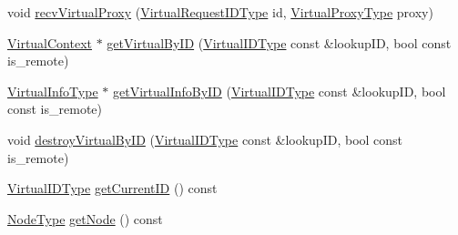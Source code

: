 \begin{DoxyCompactItemize}
\item 
void \hyperlink{structvt_1_1vrt_1_1_virtual_context_manager_ab79342508fe36427b54e3d94297e223a}{recv\+Virtual\+Proxy} (\hyperlink{namespacevt_1_1vrt_ac7ef8820ebfc383fa16f09bf46eaa2b8}{Virtual\+Request\+I\+D\+Type} id, \hyperlink{namespacevt_a1b417dd5d684f045bb58a0ede70045ac}{Virtual\+Proxy\+Type} proxy)
\item 
\hyperlink{structvt_1_1vrt_1_1_virtual_context}{Virtual\+Context} $\ast$ \hyperlink{structvt_1_1vrt_1_1_virtual_context_manager_a7e586415b9dd42012cc71134d2b5fd30}{get\+Virtual\+By\+ID} (\hyperlink{namespacevt_1_1vrt_a84d0891f52f70728c3fc2172cffb464b}{Virtual\+I\+D\+Type} const \&lookup\+ID, bool const is\+\_\+remote)
\item 
\hyperlink{structvt_1_1vrt_1_1_virtual_context_manager_ad2cd828dbd8886166b4ceb3776c49239}{Virtual\+Info\+Type} $\ast$ \hyperlink{structvt_1_1vrt_1_1_virtual_context_manager_aa05f4cec5679a32e0af06fc8283996e1}{get\+Virtual\+Info\+By\+ID} (\hyperlink{namespacevt_1_1vrt_a84d0891f52f70728c3fc2172cffb464b}{Virtual\+I\+D\+Type} const \&lookup\+ID, bool const is\+\_\+remote)
\item 
void \hyperlink{structvt_1_1vrt_1_1_virtual_context_manager_a00ec944a1360a3f4a13ecfe965c22b36}{destroy\+Virtual\+By\+ID} (\hyperlink{namespacevt_1_1vrt_a84d0891f52f70728c3fc2172cffb464b}{Virtual\+I\+D\+Type} const \&lookup\+ID, bool const is\+\_\+remote)
\item 
\hyperlink{namespacevt_1_1vrt_a84d0891f52f70728c3fc2172cffb464b}{Virtual\+I\+D\+Type} \hyperlink{structvt_1_1vrt_1_1_virtual_context_manager_ad5d3f15d0882e273bf55a48610667881}{get\+Current\+ID} () const
\item 
\hyperlink{namespacevt_a866da9d0efc19c0a1ce79e9e492f47e2}{Node\+Type} \hyperlink{structvt_1_1vrt_1_1_virtual_context_manager_ac51ab2c1e35782eeace3c1aaf297214e}{get\+Node} () const
\end{DoxyCompactItemize}
